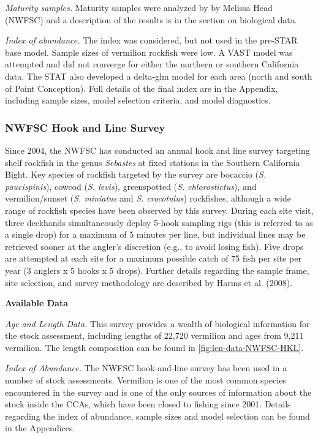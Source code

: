 \documentclass[
  english,
  a4paper,
]{article}
\begin{document}
\emph{Maturity samples.} Maturity samples were analyzed by by Melissa Head (NWFSC) and a
description of the results is in the section on biological data.

\emph{Index of abundance.} The index was considered, but not used in the pre-STAR base model. Sample
sizes of vermilion rockfish were low. A VAST model was attempted and did not converge
for either the northern or southern California data. The STAT also developed
a delta-glm model for each area (north and south of Point Conception). Full details
of the final index are in the Appendix, including
sample sizes, model selection criteria, and model diagnostics.

\hypertarget{nwfsc-hook-and-line-survey}{%
\subsubsection{NWFSC Hook and Line Survey}\label{nwfsc-hook-and-line-survey}}

Since 2004, the NWFSC has conducted an annual hook and line survey targeting shelf
rockfish in the genus \emph{Sebastes} at fixed stations in the Southern California
Bight. Key species of rockfish
targeted by the survey are bocaccio (\emph{S. paucispinis}), cowcod (\emph{S. levis}),
greenspotted (\emph{S. chlorostictus}), and vermilion/sunset (\emph{S. miniatus} and
\emph{S. crocotulus}) rockfishes, although a wide range of rockfish species have
been observed by this survey. During each site visit, three deckhands simultaneously
deploy 5-hook sampling rigs (this is referred to as a single drop) for a maximum
of 5 minutes per line, but individual lines may be retrieved sooner at the
angler's discretion (e.g., to avoid losing fish). Five drops are attempted at
each site for a maximum possible catch of 75 fish per site per year (3 anglers
x 5 hooks x 5 drops). Further details regarding the sample frame, site
selection, and survey methodology are described by Harms et al. (2008).

\textbf{Available Data}

\emph{Age and Length Data.} This survey provides a wealth of biological information for the
stock assessment, including lengths of 22,720 vermilion and ages from 9,211 vermilion.
The length composition can be found in \ref{fig:len-data-NWFSC-HKL}.

\emph{Index of Abundance.}
The NWFSC hook-and-line survey has been used in a number of stock assessments. Vermilion
is one of the most common species encountered in the survey and is one of the only sources of information
about the stock inside the CCAs, which have been closed to fishing since 2001. Details regarding the
index of abundance, sample sizes and model selection can be found in the Appendices.
\end{document}
